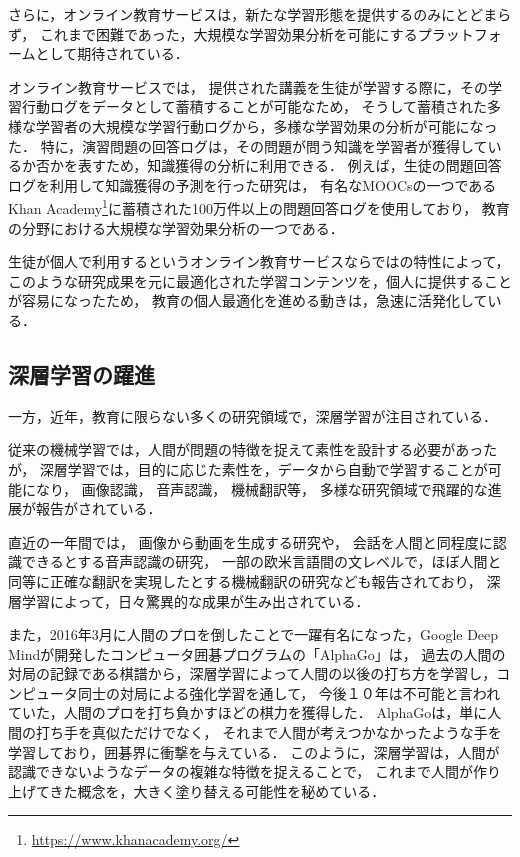 さらに，オンライン教育サービスは，新たな学習形態を提供するのみにとどまらず，
これまで困難であった，大規模な学習効果分析を可能にするプラットフォームとして期待されている．

オンライン教育サービスでは，
提供された講義を生徒が学習する際に，その学習行動ログをデータとして蓄積することが可能なため，
そうして蓄積された多様な学習者の大規模な学習行動ログから，多様な学習効果の分析が可能になった．
特に，演習問題の回答ログは，その問題が問う知識を学習者が獲得しているか否かを表すため，知識獲得の分析に利用できる\cite{corbett1994knowledge}．
例えば，生徒の問題回答ログを利用して知識獲得の予測を行った研究\cite{machardy2015toward}は，
有名なMOOCsの一つであるKhan Academy\footnote{\url{https://www.khanacademy.org/}}に蓄積された100万件以上の問題回答ログを使用しており，
教育の分野における大規模な学習効果分析の一つである．

生徒が個人で利用するというオンライン教育サービスならではの特性によって，
このような研究成果を元に最適化された学習コンテンツを，個人に提供することが容易になったため，
教育の個人最適化を進める動きは，急速に活発化している．


\subsection{深層学習の躍進}
一方，近年，教育に限らない多くの研究領域で，深層学習が注目されている．

従来の機械学習では，人間が問題の特徴を捉えて素性を設計する必要があったが，
深層学習では，目的に応じた素性を，データから自動で学習することが可能になり，
画像認識\cite{schroff2015facenet,szegedy2014going}，
音声認識\cite{hinton2012deep, bahdanau2015end}，
機械翻訳\cite{sutskever2014sequence, dong2015multi}等，
多様な研究領域で飛躍的な進展が報告がされている．

直近の一年間では，
画像から動画を生成する研究\cite{vondrick2016generating}や，
会話を人間と同程度に認識できるとする音声認識の研究\cite{xiong2016achieving}，
一部の欧米言語間の文レベルで，ほぼ人間と同等に正確な翻訳を実現したとする機械翻訳の研究\cite{wu2016google}なども報告されており，
深層学習によって，日々驚異的な成果が生み出されている．

また，2016年3月に人間のプロを倒したことで一躍有名になった，Google Deep Mindが開発したコンピュータ囲碁プログラムの「AlphaGo」\cite{silver2016mastering}は，
過去の人間の対局の記録である棋譜から，深層学習によって人間の以後の打ち方を学習し，コンピュータ同士の対局による強化学習を通して，
今後１０年は不可能と言われていた，人間のプロを打ち負かすほどの棋力を獲得した．
AlphaGoは，単に人間の打ち手を真似ただけでなく，
それまで人間が考えつかなかったような手を学習しており，囲碁界に衝撃を与えている．
このように，深層学習は，人間が認識できないようなデータの複雑な特徴を捉えることで，
これまで人間が作り上げてきた概念を，大きく塗り替える可能性を秘めている．


